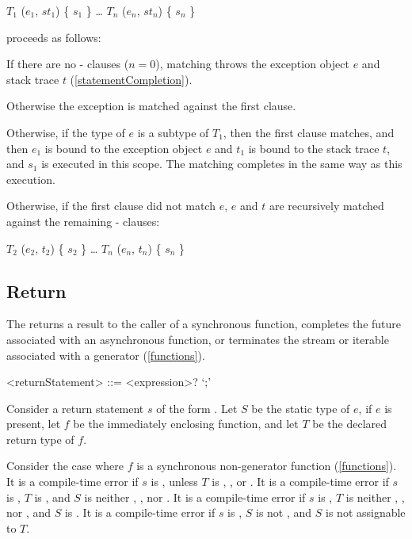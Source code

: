 \documentclass[makeidx]{article}
\begin{document}
{\begin{normativeDartCode}
\ON{} $T_1$ \CATCH{} ($e_1$, $st_1$) \{ $s_1$ \}
\ldots
\ON{} $T_n$ \CATCH{} ($e_n$, $st_n$) \{ $s_n$ \}
\end{normativeDartCode}
proceeds as follows:

\LMHash{}%
If there are no \ON{}-\CATCH{} clauses ($n = 0$), matching throws
the exception object $e$ and stack trace $t$
(\ref{statementCompletion}).

\LMHash{}%
Otherwise the exception is matched against the first clause.

\LMHash{}%
Otherwise, if the type of $e$ is a subtype of $T_1$,
then the first clause matches,
and then $e_1$ is bound to the exception object $e$
and $t_1$ is bound to the stack trace $t$,
and $s_1$ is executed in this scope.
The matching completes in the same way as this execution.

\LMHash{}%
Otherwise, if the first clause did not match $e$,
$e$ and $t$ are recursively matched against
the remaining \ON{}-\CATCH{} clauses:

\begin{normativeDartCode}
\ON{} $T_2$ \CATCH{} ($e_2$, $t_2$) \{ $s_2$ \}
\ldots
\ON{} $T_n$ \CATCH{} ($e_n$, $t_n$) \{ $s_n$ \}
\end{normativeDartCode}


\subsection{Return}

\LMHash{}%
The 
returns a result to the caller of a synchronous function,
completes the future associated with an asynchronous function,
or terminates the stream or iterable associated with a generator
(\ref{functions}).

\begin{grammar}
<returnStatement> ::= \RETURN{} <expression>? `;'
\end{grammar}

\LMHash{}%
Consider a return statement $s$ of the form .
Let $S$ be the static type of $e$, if $e$ is present,
let $f$ be the immediately enclosing function,
and let $T$ be the declared return type of $f$.

\LMHash{}%
Consider the case where $f$ is a synchronous non-generator function
(\ref{functions}).
%
It is a compile-time error if $s$ is \code{\RETURN;},
unless $T$ is \VOID, \DYNAMIC, or .
%
It is a compile-time error if $s$ is ,
$T$ is \VOID,
and $S$ is neither \VOID, \DYNAMIC, nor .
%
It is a compile-time error if $s$ is ,
$T$ is neither \VOID, \DYNAMIC, nor ,
and $S$ is \VOID.
%
It is a compile-time error if $s$ is ,
$S$ is not \VOID,
and $S$ is not assignable to $T$.

}
\end{document}
